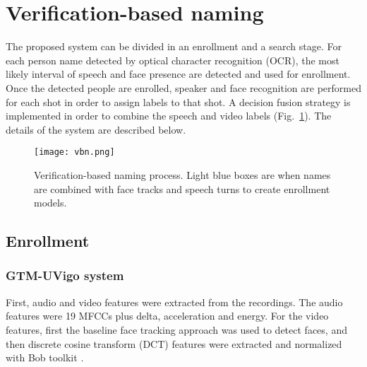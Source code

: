 \section{Verification-based naming}
\label{sec:verification}


The proposed system can be divided in an enrollment and a search stage. For each person name detected by optical character recognition (OCR), the most likely interval
of speech and face presence are detected and used for enrollment.
Once the detected people are enrolled, speaker and face recognition
are performed for each shot in order to assign labels to that shot. 
A decision fusion strategy is implemented in order to combine the speech and video labels (Fig.~\ref{fig:vbn}). The details of the system
are described below.

\begin{figure}[!htb]
 \centering
 \texttt{[image: vbn.png]}

 \caption{Verification-based naming process. Light blue boxes are when names are combined with face tracks and speech turns to create enrollment models.}
 \label{fig:vbn}
\end{figure}

\subsection{Enrollment}

\subsubsection{GTM-UVigo system}
First, audio and video features were extracted from the recordings. The audio features were 19 MFCCs plus delta, acceleration and energy. For the video features, first
the baseline face tracking approach was used to detect faces, and then discrete cosine transform (DCT) features \cite{mccool2009} were extracted and normalized with Bob toolkit \cite{bob2012}.

